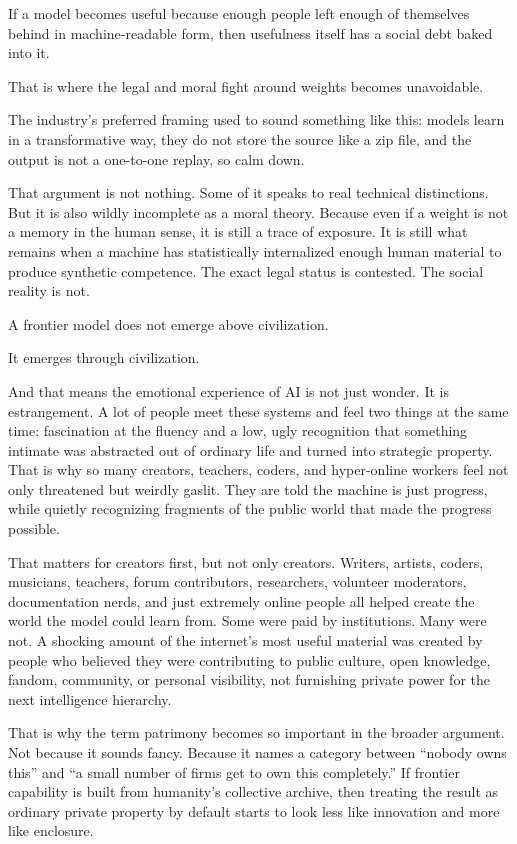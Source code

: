 \documentclass[
  american,
  12pt,
  letterpaper,
]{article}
\begin{document}
If a model becomes useful because enough people left enough of
themselves behind in machine-readable form, then usefulness itself has a
social debt baked into it.

That is where the legal and moral fight around weights becomes
unavoidable.

The industry's preferred framing used to sound something like this:
models learn in a transformative way, they do not store the source like
a zip file, and the output is not a one-to-one replay, so calm down.

That argument is not nothing. Some of it speaks to real technical
distinctions. But it is also wildly incomplete as a moral theory.
Because even if a weight is not a memory in the human sense, it is still
a trace of exposure. It is still what remains when a machine has
statistically internalized enough human material to produce synthetic
competence. The exact legal status is contested. The social reality is
not.

A frontier model does not emerge above civilization.

It emerges through civilization.

And that means the emotional experience of AI is not just wonder. It is
estrangement. A lot of people meet these systems and feel two things at
the same time: fascination at the fluency and a low, ugly recognition
that something intimate was abstracted out of ordinary life and turned
into strategic property. That is why so many creators, teachers, coders,
and hyper-online workers feel not only threatened but weirdly gaslit.
They are told the machine is just progress, while quietly recognizing
fragments of the public world that made the progress possible.

That matters for creators first, but not only creators. Writers,
artists, coders, musicians, teachers, forum contributors, researchers,
volunteer moderators, documentation nerds, and just extremely online
people all helped create the world the model could learn from. Some were
paid by institutions. Many were not. A shocking amount of the internet's
most useful material was created by people who believed they were
contributing to public culture, open knowledge, fandom, community, or
personal visibility, not furnishing private power for the next
intelligence hierarchy.

That is why the term patrimony becomes so important in the broader
argument. Not because it sounds fancy. Because it names a category
between ``nobody owns this'' and ``a small number of firms get to own
this completely.'' If frontier capability is built from humanity's
collective archive, then treating the result as ordinary private
property by default starts to look less like innovation and more like
enclosure.
\end{document}
